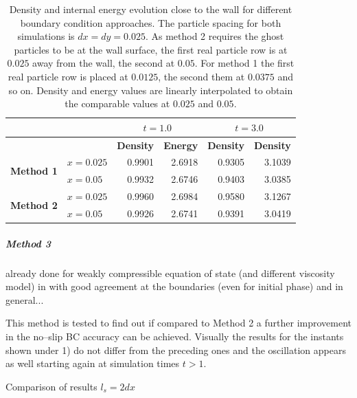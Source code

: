 \documentclass{report}
\begin{document}
\begin{table}[h] %
\label{tab:2DSPH_LinearWall_Poiseuille_WallErrorsRho_e}
\centering
\begin{tabular}[c]{||c||l||r|r||r|r||} %
\hline
&&\multicolumn{2}{|c|}{\textbf{$t=1.0$}}& \multicolumn{2}{|c|}{\textbf{$t=3.0$}}\\
\hline
 &&{\bf Density} & {\bf Energy} & {\bf Density}& {\bf Density}\\
\hline
\hline
\multirow{2}{*}{{\bf Method 1}} &$x=0.025$&0.9901 & 2.6918 & 0.9305& 3.1039 \\
\hline
&$x=0.05$&0.9932 &2.6746 &0.9403 & 3.0385\\
\hline
\multirow{2}{*}{{\bf Method 2}}&$x=0.025$&0.9960 & 2.6984& 0.9580 & 3.1267 \\
\hline
&$x=0.05$&0.9926 & 2.6741 & 0.9391&3.0419 \\
\hline
\hline
\end{tabular}
\caption[]{Density and internal energy evolution close to the wall for different boundary condition approaches. The particle spacing for both simulations is $dx=dy=0.025$. As method 2 requires the ghost particles to be at the wall surface, the first real particle row is at $0.025$ away from the wall, the second at $0.05$. For method 1 the first real particle row is placed at $0.0125$, the second them at $0.0375$ and so on. Density and energy values are linearly interpolated to obtain the comparable values at $0.025$ and $0.05$.}
\end{table}




\subparagraph{Method 3}

already done for weakly compressible equation of state (and different viscosity model) in \cite{Morris1997} with good agreement at the boundaries (even for initial phase) and in general... 

This method is tested to find out if compared to Method 2 a further improvement in the no--slip BC accuracy can be achieved. Visually the results for the instants shown under 1) do not differ from the preceding ones and the oscillation appears as well starting again at simulation times $t>1$.



Comparison of results $l_s=2dx$
\end{document}
